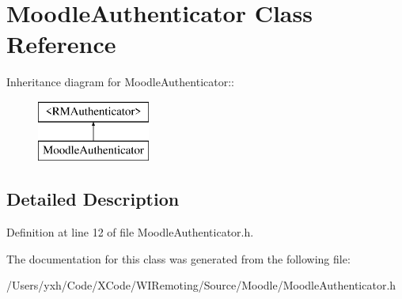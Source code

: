 \hypertarget{interface_moodle_authenticator}{
\section{MoodleAuthenticator Class Reference}
\label{interface_moodle_authenticator}
}
Inheritance diagram for MoodleAuthenticator::\begin{figure}[H]
\begin{center}
\leavevmode
\includegraphics[height=2cm]{interface_moodle_authenticator}
\end{center}
\end{figure}


\subsection{Detailed Description}


Definition at line 12 of file MoodleAuthenticator.h.

The documentation for this class was generated from the following file:\begin{DoxyCompactItemize}
\item 
/Users/yxh/Code/XCode/WIRemoting/Source/Moodle/MoodleAuthenticator.h\end{DoxyCompactItemize}
